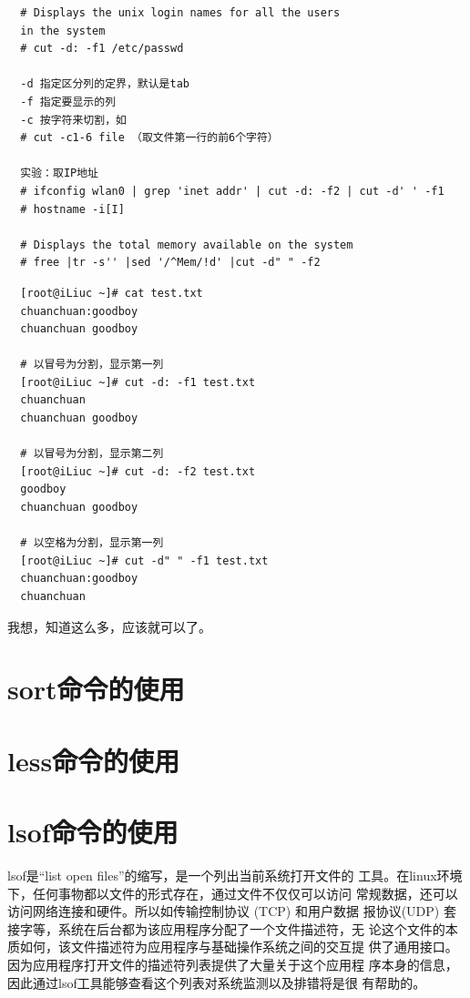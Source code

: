 \small{
\begin{verbatim}
  # Displays the unix login names for all the users
  in the system
  # cut -d: -f1 /etc/passwd

  -d 指定区分列的定界，默认是tab
  -f 指定要显示的列
  -c 按字符来切割，如
  # cut -c1-6 file （取文件第一行的前6个字符）

  实验：取IP地址
  # ifconfig wlan0 | grep 'inet addr' | cut -d: -f2 | cut -d' ' -f1
  # hostname -i[I]

  # Displays the total memory available on the system
  # free |tr -s'' |sed '/^Mem/!d' |cut -d" " -f2
\end{verbatim}
}
\normalsize

\small{
\begin{verbatim}
  [root@iLiuc ~]# cat test.txt
  chuanchuan:goodboy
  chuanchuan goodboy

  # 以冒号为分割，显示第一列
  [root@iLiuc ~]# cut -d: -f1 test.txt
  chuanchuan
  chuanchuan goodboy

  # 以冒号为分割，显示第二列
  [root@iLiuc ~]# cut -d: -f2 test.txt
  goodboy
  chuanchuan goodboy

  # 以空格为分割，显示第一列
  [root@iLiuc ~]# cut -d" " -f1 test.txt
  chuanchuan:goodboy
  chuanchuan
\end{verbatim}
}
\normalsize

我想，知道这么多，应该就可以了。

\section{sort命令的使用}
\label{sec:sortCmd}

\section{less命令的使用}
\label{sec:lessCmd}

\section{lsof命令的使用}
\label{sec:lsofCmd}

lsof是“list open files”的缩写，是一个列出当前系统打开文件的
工具。在linux环境下，任何事物都以文件的形式存在，通过文件不仅仅可以访问
常规数据，还可以访问网络连接和硬件。所以如传输控制协议 (TCP) 和用户数据
报协议(UDP) 套接字等，系统在后台都为该应用程序分配了一个文件描述符，无
论这个文件的本质如何，该文件描述符为应用程序与基础操作系统之间的交互提
供了通用接口。因为应用程序打开文件的描述符列表提供了大量关于这个应用程
序本身的信息，因此通过lsof工具能够查看这个列表对系统监测以及排错将是很
有帮助的。

